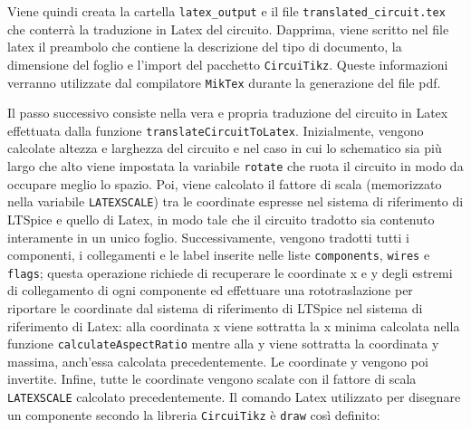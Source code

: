 \noindent
Viene quindi creata la cartella \texttt{latex\_output} e il file \texttt{translated\_circuit.tex} che conterrà la traduzione in Latex del circuito. Dapprima, viene scritto nel file latex il preambolo che contiene la descrizione del tipo di documento, la dimensione del foglio e l'import del pacchetto \texttt{CircuiTikz}. Queste informazioni verranno utilizzate dal compilatore \texttt{MikTex} durante la generazione del file pdf.

\noindent
Il passo successivo consiste nella vera e propria traduzione del circuito in Latex effettuata dalla funzione \texttt{translateCircuitToLatex}. Inizialmente, vengono calcolate altezza e larghezza del circuito e nel caso in cui lo schematico sia più largo che alto viene impostata la variabile \texttt{rotate} che ruota il circuito in modo da occupare meglio lo spazio. Poi, viene calcolato il fattore di scala (memorizzato nella variabile \texttt{LATEXSCALE}) tra le coordinate espresse nel sistema di riferimento di LTSpice e quello di Latex, in modo tale che il circuito tradotto sia contenuto interamente in un unico foglio. Successivamente, vengono tradotti tutti i componenti, i collegamenti e le label inserite nelle liste \texttt{components}, \texttt{wires} e \texttt{flags}; questa operazione richiede di recuperare le coordinate x e y degli estremi di collegamento di ogni componente ed effettuare una rototraslazione per riportare le coordinate dal sistema di riferimento di LTSpice nel sistema di riferimento di Latex: alla coordinata x viene sottratta la x minima calcolata nella funzione \texttt{calculateAspectRatio} mentre alla y viene sottratta la coordinata y massima, anch'essa calcolata precedentemente. Le coordinate y vengono poi invertite. Infine, tutte le coordinate vengono scalate con il fattore di scala \texttt{LATEXSCALE} calcolato precedentemente. Il comando Latex utilizzato per disegnare un componente secondo la libreria \texttt{CircuiTikz} è \texttt{draw} così definito:
